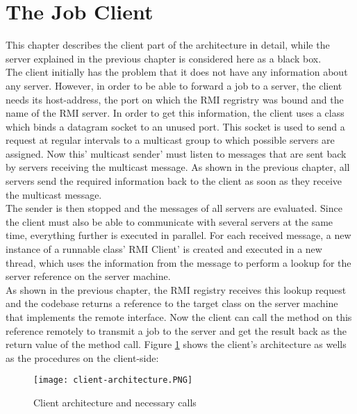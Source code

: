 \section{The Job Client}
This chapter describes the client part of the architecture in detail, while the server explained in the previous chapter is considered here as a black box.\\
The client initially has the problem that it does not have any information about any server. However, in order to be able to forward a job to a server, the client needs its host-address, the port on which the RMI regristry was bound and the name of the RMI server. In order to get this information, the client uses a class which binds a datagram socket to an unused port. This socket is used to send a request at regular intervals to a multicast group to which possible servers are assigned. Now this' multicast sender' must listen to messages that are sent back by servers receiving the multicast message. As shown in the previous chapter, all servers send the required information back to the client as soon as they receive the multicast message.\\
The sender is then stopped and the messages of all servers are evaluated. Since the client must also be able to communicate with several servers at the same time, everything further is executed in parallel. For each received message, a new instance of a runnable class' RMI Client' is created and executed in a new thread, which uses the information from the message to perform a lookup for the server reference on the server machine.\\
As shown in the previous chapter, the RMI registry receives this lookup request and the codebase returns a reference to the target class on the server machine that implements the remote interface. Now the client can call the method on this reference remotely to transmit a job to the server and get the result back as the return value of the method call. Figure \ref{client-architecture} shows the client's architecture as wells as the procedures on the client-side:
\begin{figure}[H]
	\centering
	\texttt{[image: client-architecture.PNG]}
	\caption{Client architecture and necessary calls}
	\label{client-architecture}
\end{figure} 
